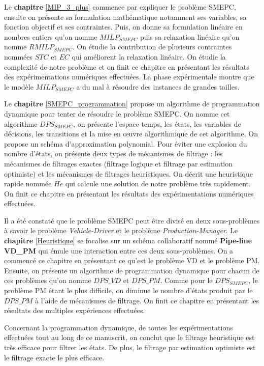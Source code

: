 	Le \textbf{chapitre} \ref{MIP_3_plus} commence par expliquer le problème SMEPC, ensuite on présente sa formulation mathématique notamment ses variables, sa fonction objectif et ses contraintes. Puis, on donne sa formulation linéaire en nombres entiers qu'on nomme $MILP_{SMEPC}$ puis sa relaxation linéaire qu'on nomme $RMILP_{SMEPC}$. On étudie la contribution de plusieurs contraintes nommées $STC$ et $EC$ qui améliorent la relaxation linéaire. On étudie la complexité de notre problème et on finit ce chapitre en présentant les résultats des expérimentations numériques effectuées. La phase expérimentale montre que le modèle $MILP_{SMEPC}$ a du mal à résoudre des instances de \og grandes \fg{} tailles.
	
	Le \textbf{chapitre} \ref{SMEPC_programmation} propose un algorithme de programmation dynamique pour tenter de résoudre le problème SMEPC. On nomme cet algorithme $DPS_{SMEPC}$, on présente l'espace temps, les états, les variables de décisions, les transitions et la mise en œuvre algorithmique de cet algorithme. On propose un schéma d'approximation polynomial. Pour éviter une explosion du nombre d'états, on présente deux types de mécanismes de filtrage : les mécanismes de filtrages exactes (filtrage logique et filtrage par estimation optimiste) et les mécanismes de filtrages heuristiques. On décrit une heuristique rapide nommée $He$ qui calcule une solution de notre problème très rapidement. On finit ce chapitre en présentant les résultats des expérimentations numériques effectuées. 
	
	Il a été constaté que le problème SMEPC peut être divisé en deux sous-problèmes à savoir le problème \textit{Vehicle-Driver} et le problème \textit{Production-Manager}. Le \textbf{chapitre} \ref{Heuristique} se focalise sur un schéma collaboratif nommé \textbf{Pipe-line VD\_PM} qui émule une interaction entre ces deux sous-problèmes. On a commencé ce chapitre en présentant ce qu'est le problème VD et le problème PM. Ensuite, on présente un algorithme de programmation dynamique pour chacun de ces problèmes qu'on nomme $DPS\_VD$ et $DPS\_PM$. Comme pour le $DPS_{SMEPC}$, le problème PM étant le plus difficile, on diminue le nombre d'états produit par le $DPS\_PM$ à l'aide de mécanismes de filtrage. On finit ce chapitre en présentant les résultats des multiples expériences effectuées.
	
	Concernant la programmation dynamique, de toutes les expérimentations effectuées tout au long de ce manuscrit, on conclut que le filtrage heuristique est très efficace pour filtrer les états. De plus, le filtrage par estimation optimiste est le filtrage exacte le plus efficace. 
	
